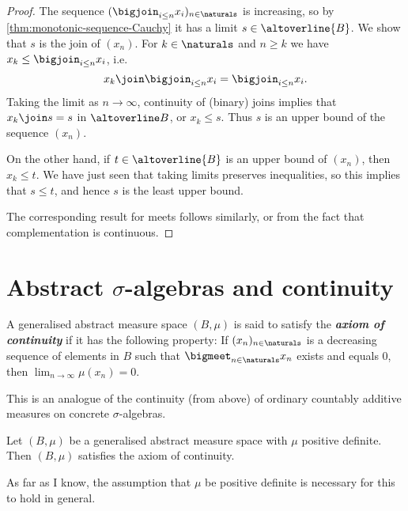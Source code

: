 \documentclass[article, a4paper, 11pt, oneside]{memoir}
\numberwithin{equation}{chapter}
\newcommand{\keyword}[1]{{\itshape\bfseries #1}}
\begin{document}
\begin{proof}
    The sequence $( \bigjoin_{i \leq n} x_i )_{n\in\naturals}$ is increasing, so by \cref{thm:monotonic-sequence-Cauchy} it has a limit $s \in \altoverline{B}$. We show that $s$ is the join of $(x_n)$. For $k \in \naturals$ and $n \geq k$ we have $x_k \leq \bigjoin_{i \leq n} x_i$, i.e.
    \begin{equation*}
        x_k \join \bigjoin_{i \leq n} x_i
            = \bigjoin_{i \leq n} x_i.
    \end{equation*}
    Taking the limit as $n \to \infty$, continuity of (binary) joins implies that $x_k \join s = s$ in $\altoverline B$, or $x_k \leq s$. Thus $s$ is an upper bound of the sequence $(x_n)$.

    On the other hand, if $t \in \altoverline{B}$ is an upper bound of $(x_n)$, then $x_k \leq t$. We have just seen that taking limits preserves inequalities, so this implies that $s \leq t$, and hence $s$ is the least upper bound.

    The corresponding result for meets follows similarly, or from the fact that complementation is continuous.
\end{proof}


\section[Abstract sigma-algebras and continuity][Abstract $\sigma$-algebras and continuity]{Abstract $\sigma$-algebras and continuity}

\begin{definition}
    A generalised abstract measure space $(B, \mu)$ is said to satisfy the \keyword{axiom of continuity} if it has the following property: If $(x_n)_{n\in\naturals}$ is a decreasing sequence of elements in $B$ such that $\bigmeet_{n\in\naturals} x_n$ exists and equals $0$, then $\lim_{n\to\infty} \mu(x_n) = 0$.
\end{definition}
%
This is an analogue of the continuity (from above) of ordinary countably additive measures on concrete $\sigma$-algebras.


\begin{lemma}
    \label{thm:positive-definite-implies-continuous}
    Let $(B, \mu)$ be a generalised abstract measure space with $\mu$ positive definite. Then $(B,\mu)$ satisfies the axiom of continuity.
\end{lemma}
%
As far as I know, the assumption that $\mu$ be positive definite is necessary for this to hold in general.
\end{document}
